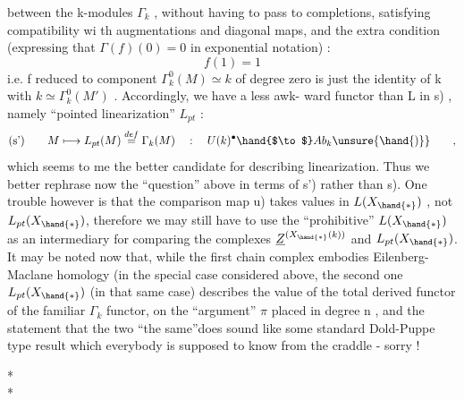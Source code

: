 
between the k-modules $\Gamma_k$ ,  without having to pass to completions,
satisfying compatibility wi th augmentations and diagonal maps,  and
the extra condition  (expressing that $\Gamma(f)(0) = 0$ \xout{\unsure{)}} in exponential
notation) :
\[ f(1) = 1 \]
i.e. f reduced to component  $\Gamma_k^{0}(M)\simeq k$  of degree zero is just
the identity of k with  $k\simeq\Gamma_k^{0}(M')$ .  Accordingly,  we have a less awk-%
ward  functor than L in \hand{(}s) ,  namely ``pointed linearization'' $L_{pt}$ :
\[ \text{(s')} \qquad M\longmapsto L_{pt}(M)\overset{def}{=}\Gamma_k(M) \quad : \quad U(k)^{\bullet}\hand{$\to$} Ab_k \unsure{\hand{)}} \qquad , \]
 which seems to me the better candidate for describing linearization.
Thus we better rephrase now the ``question'' above in terms of \hand{(}s') rather
than \hand{(}s).  One trouble however is that the comparison map \hand{(}u)  takes 
values in $L(X_{\hand{*}})$ ,  not $L_{pt}(X_{\hand{*}})$,  therefore we may still have to use
the ``prohibitive'' $L(X_{\hand{*}})$  as an intermediary for comparing  the complexes
$\underline{Z}^{(X_{\hand{*}}(k))}$  and $L_{pt}(X_{\hand{*}})$.  It may be noted now that,  while the first chain
 complex embodies  Eilenberg-Maclane homology   (in the special case
considered above\hand{)}, the second one  $L_{pt}(X_{\hand{*}})$  (in that same case) describes
the value of the total derived functor of the familiar $\Gamma_k$ functor,  on
the ``argument'' $\pi$ placed in degree n ,  and the statement that the two
``the same''does sound like some standard Dold-Puppe type result
which everybody is supposed to know from the craddle  - sorry !

\begin{center}
* \qquad *\\
*
\end{center}

